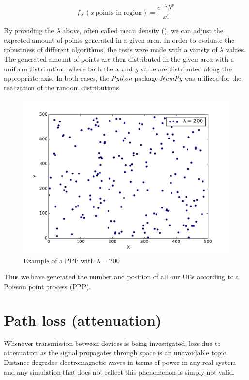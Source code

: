 \begin{equation} \label{eq:Poisson}
f_X(x\,\text{points in region}) = \frac{{e^{ - \lambda } \lambda ^x }}{{x!}}
\end{equation}

By providing the $\lambda$ above, often called mean density (\cite{Keeler2016}), we can adjust the expected amount of points generated in a given area. In order to evaluate the robustness of different algorithms, the tests were made with a variety of $\lambda$ values. The generated amount of points are then distributed in the given area with a uniform distribution, where both the $x$ and $y$ value are distributed along the appropriate axis. In both cases, the \textit{Python} package \textit{NumPy} was utilized for the realization of the random distributions.

\begin{figure}[!h]
\centering
\includegraphics[scale = 0.6]{figures/PPP}
\caption{Example of a PPP with $\lambda = 200$}
\end{figure}

Thus we have generated the number and position of all our UEs according to a Poisson point process (PPP).

\section{Path loss (attenuation)} \label{PL}
Whenever transmission between devices is being investigated, loss due to attenuation as the signal propagates through space is an unavoidable topic. Distance degrades electromagnetic waves in terms of power in any real system and any simulation that does not reflect this phenomenon is simply not valid. 

